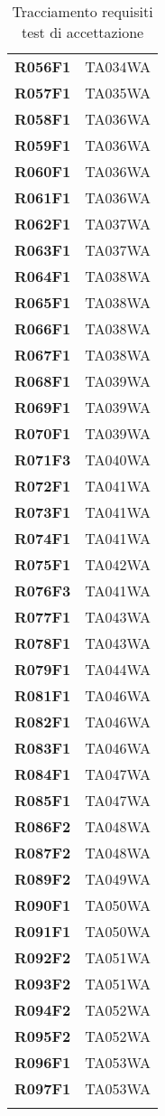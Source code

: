 \documentclass[../../piano-di-qualifica.tex]{subfiles}
\begin{document}
\begin{longtable}[H]{>{\centering\bfseries}m{5cm} >{\centering\arraybackslash}m{5cm}}
  R056F1 &  TA034WA\\
  R057F1 &  TA035WA\\
  R058F1 &  TA036WA\\
  R059F1 &  TA036WA\\
  R060F1 &  TA036WA\\
  R061F1 &  TA036WA\\
  R062F1 &  TA037WA\\
  R063F1 &  TA037WA\\
  R064F1 &  TA038WA\\
  R065F1 &  TA038WA\\
  R066F1 &  TA038WA\\
  R067F1 &  TA038WA\\
  R068F1 &  TA039WA\\
  R069F1 &  TA039WA\\
  R070F1 &  TA039WA\\
  R071F3 &  TA040WA\\
  R072F1 &  TA041WA\\
  R073F1 &  TA041WA\\
  R074F1 &  TA041WA\\
  R075F1 &  TA042WA\\
  R076F3 &  TA041WA\\
  R077F1 &  TA043WA\\
  R078F1 &  TA043WA\\
  R079F1 &  TA044WA\\
  R081F1 &  TA046WA\\
  R082F1 &  TA046WA\\
  R083F1 &  TA046WA\\
  R084F1 &  TA047WA\\
  R085F1 &  TA047WA\\
  R086F2 &  TA048WA\\
  R087F2 &  TA048WA\\
  R089F2 &  TA049WA\\
  R090F1 &  TA050WA\\
  R091F1 &  TA050WA\\
  R092F2 &  TA051WA\\
  R093F2 &  TA051WA\\
  R094F2 &  TA052WA\\
  R095F2 &  TA052WA\\
  R096F1 &  TA053WA\\
  R097F1 &  TA053WA\\

  \rowcolor{white}
  \caption{Tracciamento requisiti \- test di accettazione}%
  \label{tab:test_sistema_requisito}
\end{longtable}
\end{document}
